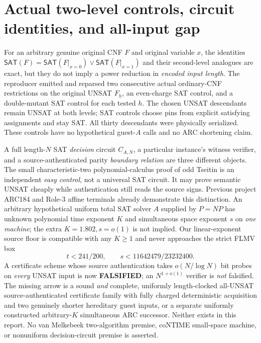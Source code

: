 \documentclass[11pt]{article}
\newcommand{\SAT}{\mathsf{SAT}}
\begin{document}
\section{Actual two-level controls, circuit identities, and all-input gap}
For an arbitrary genuine original CNF $F$ and original variable $x$, the identities $\SAT(F)=\SAT(F\vert_{x=0})\lor\SAT(F\vert_{x=1})$ and their second-level analogues are exact, but they do not imply a power reduction in \emph{encoded input length}. The reproducer emitted and reparsed two consecutive actual ordinary-CNF restrictions on the original UNSAT $F_h$, an even-charge SAT control, and a double-mutant SAT control for each tested $h$. The chosen UNSAT descendants remain UNSAT at both levels; SAT controls choose pins from explicit satisfying assignments and stay SAT. All thirty descendants were physically serialized. These controls have no hypothetical guest-$A$ calls and no ARC shortening claim.

A full length-$N$ SAT \emph{decision} circuit $C_{A,N}$, a particular instance's witness verifier, and a source-authenticated parity \emph{boundary relation} are three different objects. The small characteristic-two polynomial-calculus proof of odd Tseitin is an independent \emph{easy control}, not a universal SAT circuit. It may prove semantic UNSAT cheaply while authentication still reads the source signs. Previous project ARC184 and Role-3 affine terminals already demonstrate this distinction. An arbitrary hypothetical uniform total SAT solver $A$ supplied by $P=NP$ has unknown polynomial time exponent $K$ and simultaneous space exponent $s$ on \emph{one machine}; the extra $K=1.802,s=o(1)$ is not implied. Our linear-exponent source floor is compatible with any $K\ge1$ and never approaches the strict FLMV box
\[
                  t<241/200,\qquad s<11642479/23232400.
\tag{7}
\]
A certificate scheme whose source authentication takes $o(N/\log N)$ bit probes on \emph{every} UNSAT input is now \textbf{FALSIFIED}; an $N^{1+o(1)}$ verifier is \emph{not} falsified. The missing arrow is a sound \emph{and} complete, uniformly length-clocked all-UNSAT source-authenticated certificate family with fully charged deterministic acquisition and two genuinely shorter hereditary guest inputs, or a separate uniformly constructed arbitrary-$K$ simultaneous ARC successor. Neither exists in this report. No van Melkebeek two-algorithm premise, coNTIME small-space machine, or nonuniform decision-circuit premise is asserted.
\end{document}
